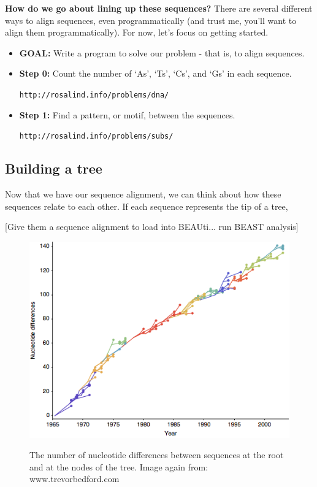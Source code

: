 \documentclass{scrartcl}
\begin{document}
\vspace{2mm}

\vspace{2mm}
\textbf{How do we go about lining up these sequences?}  There are several different ways to align sequences, even programmatically (and trust me, you'll 
want to align them programmatically).  For now, let's focus on getting started.  

\begin{itemize}
\item \textbf{GOAL:}  Write a program to solve our problem - that is, to align sequences.
\item \textbf{Step 0:}  Count the number of `As', `Ts', `Cs', and `Gs' in each sequence. 

\texttt{http://rosalind.info/problems/dna/}
\item \textbf{Step 1:}  Find a pattern, or motif, between the sequences. 

\texttt{http://rosalind.info/problems/subs/}
\end{itemize}


\subsection{Building a tree}

Now that we have our sequence alignment, we can think about how these sequences relate to each other.  If each sequence represents the tip of a tree,

\vspace{2mm}
[Give them a sequence alignment to load into BEAUti... run BEAST analysis]

\begin{figure}[H] 
\center
{\includegraphics[width=0.7\linewidth]{SmithClusters.png}}
\caption{The number of nucleotide differences between sequences at the root and at the nodes of the tree. Image again from: www.trevorbedford.com}
\label{sequencesToTrees}
\end{figure}
\end{document}
